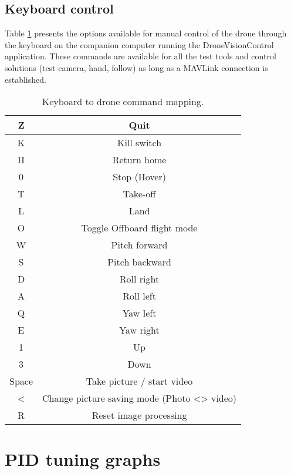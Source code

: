\section{Keyboard control}
\label{app:keyboard}

Table \ref{tab:keyboard} presents the options available for manual control of the drone through the keyboard on the companion computer running the DroneVisionControl application. These commands are available for all the test tools and control solutions (test-camera, hand, follow) as long as a MAVLink connection is established.

\begingroup
\setlength{\tabcolsep}{15pt}
\renewcommand{\arraystretch}{1.6}
\begin{table}
    \centering
    \begin{tabular}{c||c}
        Z & Quit \\ \hline
        K & Kill switch \\ \hline
        H & Return home \\ \hline
        0 & Stop (Hover) \\ \hline
        T & Take-off \\ \hline
        L & Land \\ \hline
        O & Toggle Offboard flight mode \\ \hline
        W & Pitch forward \\ \hline
        S & Pitch backward \\ \hline
        D & Roll right \\ \hline
        A & Roll left \\ \hline
        Q & Yaw left \\ \hline
        E & Yaw right \\ \hline
        1 & Up \\ \hline
        3 & Down \\ \hline
        Space & Take picture / start video \\ \hline
        < & Change picture saving mode (Photo <> video) \\ \hline
        R & Reset image processing \\ %
    \end{tabular}
    \caption{Keyboard to drone command mapping.}
    \label{tab:keyboard}
\end{table}
\endgroup



\chapter{PID tuning graphs}
\label{app:pid-results}

